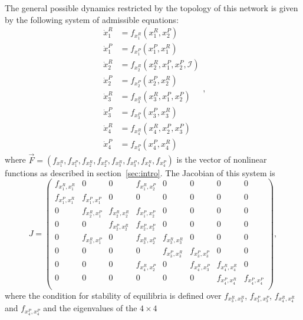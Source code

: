 The general possible dynamics restricted by
the topology of this network is given by the following system of 
admissible equations:
\begin{equation}
    \begin{aligned}
        \dot{x}_1^R &= f_{x_1^R}(x_1^R, x_2^P)\\
        \dot{x}_1^P &= f_{x_1^P}(x_1^P, x_1^R)\\
        \dot{x}_2^R &= f_{x_2^R}(x_2^R, x_1^P, x_2^P, \mathcal{I})\\
        \dot{x}_2^P &= f_{x_2^P}(x_2^P, x_2^R)\\
        \dot{x}_3^R &= f_{x_3^R}(x_3^R, x_1^P, x_2^P)\\
        \dot{x}_3^P &= f_{x_3^P}(x_3^P, x_3^R)\\
        \dot{x}_4^R &= f_{x_4^R}(x_4^R, x_2^P, x_3^P)\\
        \dot{x}_4^P &= f_{x_4^P}(x_4^P, x_4^R)
    \end{aligned},
\end{equation}
where $\vec{F} = (f_{x_1^R}, f_{x_1^P}, f_{x_2^R}, f_{x_2^P}, 
f_{x_3^R}, f_{x_3^P}, f_{x_4^R}, f_{x_4^P})$ is 
the vector of nonlinear functions as described in 
section~\ref{sec:intro}. The Jacobian of this system is 
\begin{equation}
    J = 
    \begin{pmatrix}
        f_{x_1^R,x_1^R} & 0 & 0 & f_{x_1^R, x_2^P} & 0 & 0 & 0 & 0 \\
        f_{x_1^P,x_1^R} & f_{x_1^P,x_1^P} & 0 & 0 & 0 & 0 & 0 & 0 \\
        0 & f_{x_2^R,x_1^P} & f_{x_2^R,x_2^R} & f_{x_1^P, x_2^P} & 0 & 0 & 0 & 0 \\
        0 & 0 & f_{x_2^P,x_2^R} & f_{x_2^P,x_2^P} & 0 & 0 & 0 & 0 \\
        0 & f_{x_3^R,x_1^P} & 0 & f_{x_3^R,x_2^P} & f_{x_3^R,x_3^R} & 0 & 0 & 0 \\
        0 & 0 & 0 & 0 & f_{x_3^P,x_3^R} & f_{x_3^P,x_3^P} & 0 & 0 \\
        0 & 0 & 0 & f_{x_4^R,x_2^P} & 0 & f_{x_4^R,x_3^P} & f_{x_4^R,x_4^R} & 0 \\
        0 & 0 & 0 & 0 & 0 & 0 & f_{x_4^P, x_4^R} & f_{x_4^P, x_4^P} \\
    \end{pmatrix},
\end{equation} 
where the condition for stability of equilibria is defined over 
$f_{x_3^R,x_3^R}$, $f_{x_3^P,x_3^P}$, $f_{x_4^R,x_4^R}$ and 
$f_{x_4^P,x_4^P}$ and the eigenvalues of the $4 \times 4$ 
